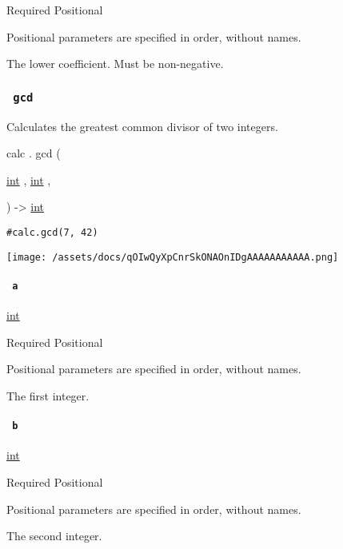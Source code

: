 {Required} {{ Positional }}

\label{functions-binom-k-positional-tooltip}
Positional parameters are specified in order, without names.

The lower coefficient. Must be non-negative.

\subsubsection{\texorpdfstring{\texttt{\ gcd\ }}{ gcd }}\label{functions-gcd}

Calculates the greatest common divisor of two integers.

calc { . } { gcd } (

{ \href{/docs/reference/foundations/int/}{int} , } {
\href{/docs/reference/foundations/int/}{int} , }

) -\textgreater{} \href{/docs/reference/foundations/int/}{int}

\begin{verbatim}
#calc.gcd(7, 42)
\end{verbatim}

\texttt{[image: /assets/docs/qOIwQyXpCnrSkONAOnIDgAAAAAAAAAAA.png]}

\paragraph{\texorpdfstring{\texttt{\ a\ }}{ a }}\label{functions-gcd-a}

\href{/docs/reference/foundations/int/}{int}

{Required} {{ Positional }}

\label{functions-gcd-a-positional-tooltip}
Positional parameters are specified in order, without names.

The first integer.

\paragraph{\texorpdfstring{\texttt{\ b\ }}{ b }}\label{functions-gcd-b}

\href{/docs/reference/foundations/int/}{int}

{Required} {{ Positional }}

\label{functions-gcd-b-positional-tooltip}
Positional parameters are specified in order, without names.

The second integer.

